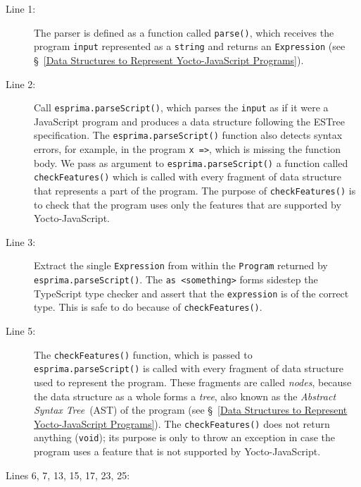 \documentclass[12pt, oneside]{book}
\begin{document}
\begin{description}
\item [Line 1:]

The parser is defined as a function called \texttt{parse()}, which receives the program \texttt{input} represented as a \texttt{string} and returns an \texttt{Expression} (see §~\ref{Data Structures to Represent Yocto-JavaScript Programs}).

\item [Line 2:]

Call \texttt{esprima.parseScript()}, which parses the \texttt{input} as if it were a JavaScript program and produces a data structure following the ESTree specification. The \texttt{esprima.parseScript()} function also detects syntax errors, for example, in the program \texttt{x =>}, which is missing the function body. We pass as argument to \texttt{esprima.parseScript()} a function called \texttt{checkFeatures()} which is called with every fragment of data structure that represents a part of the program. The purpose of \texttt{checkFeatures()} is to check that the program uses only the features that are supported by Yocto-JavaScript.

\item [Line 3:]

Extract the single \texttt{Expression} from within the \texttt{Program} returned by \texttt{esprima.parseScript()}. The \texttt{as <something>} forms sidestep the TypeScript type checker and assert that the \texttt{expression} is of the correct type. This is safe to do because of \texttt{checkFeatures()}.

\item [Line 5:]

The \texttt{checkFeatures()} function, which is passed to \texttt{esprima.parseScript()} is called with every fragment of data structure used to represent the program. These fragments are called \emph{nodes}, because the data structure as a whole forms a \emph{tree}, also known as the \emph{Abstract Syntax Tree}~(AST) of the program (see §~\ref{Data Structures to Represent Yocto-JavaScript Programs}). The \texttt{checkFeatures()} does not return anything (\texttt{void}); its purpose is only to throw an exception in case the program uses a feature that is not supported by Yocto-JavaScript.

\item [Lines 6, 7, 13, 15, 17, 23, 25:]


\end{description}
\end{document}
